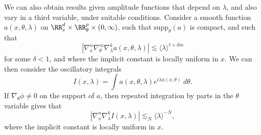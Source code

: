 We can also obtain results given amplitude functions that depend on $\lambda$, and also vary in a third variable, under suitable conditions. Consider a smooth function $a(x,\theta,\lambda)$ on $\RR^d_x \times \RR^p_\theta \times (0,\infty)$, such that $\text{supp}_\theta(a)$ is compact, and such that
%
\[ \left| \nabla_x^n \nabla_\theta^m \nabla_\lambda^k a(x,\theta,\lambda) \right| \lesssim \langle \lambda \rangle^{t + \delta m} \]
%
for some $\delta < 1$, and where the implicit constant is locally uniform in $x$. We can then consider the oscillatory integrals
%
\[ I(x,\lambda) = \int a(x,\theta,\lambda) e^{i \lambda \phi(x,\theta)}\; d\theta. \]
%
If $\nabla_\theta \phi \neq 0$ on the support of $a$, then repeated integration by parts in the $\theta$ variable gives that
%
\[ |\nabla_x^n \nabla_\lambda^k I(x,\lambda)| \lesssim_N \langle \lambda \rangle^{-N}, \]
%
where the implicit constant is locally uniform in $x$.


